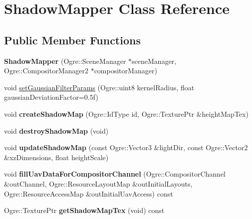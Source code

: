 \hypertarget{class_shadow_mapper}{}\section{Shadow\+Mapper Class Reference}
\label{class_shadow_mapper}
\subsection*{Public Member Functions}
\begin{DoxyCompactItemize}
\item 
\mbox{\label{class_shadow_mapper_a83504b2db6dc914c993011d388d3c139}} 
{\bfseries Shadow\+Mapper} (Ogre\+::\+Scene\+Manager $\ast$scene\+Manager, Ogre\+::\+Compositor\+Manager2 $\ast$compositor\+Manager)
\item 
void \hyperlink{class_shadow_mapper_a5438f906adc558347171a1d4fbbe616d}{set\+Gaussian\+Filter\+Params} (Ogre\+::uint8 kernel\+Radius, float gaussian\+Deviation\+Factor=0.\+5f)
\item 
\mbox{\label{class_shadow_mapper_a05511961c2261cd32eacf534bf0873a8}} 
void {\bfseries create\+Shadow\+Map} (Ogre\+::\+Id\+Type id, Ogre\+::\+Texture\+Ptr \&height\+Map\+Tex)
\item 
\mbox{\label{class_shadow_mapper_aaa7a869e868690bf241b83d9bcb8626d}} 
void {\bfseries destroy\+Shadow\+Map} (void)
\item 
\mbox{\label{class_shadow_mapper_afa29619eed1b51a4088bbfbd64cf1a1a}} 
void {\bfseries update\+Shadow\+Map} (const Ogre\+::\+Vector3 \&light\+Dir, const Ogre\+::\+Vector2 \&xz\+Dimensions, float height\+Scale)
\item 
\mbox{\label{class_shadow_mapper_a993ea2a8424fc5b966bac231b14c5353}} 
void {\bfseries fill\+Uav\+Data\+For\+Compositor\+Channel} (Ogre\+::\+Compositor\+Channel \&out\+Channel, Ogre\+::\+Resource\+Layout\+Map \&out\+Initial\+Layouts, Ogre\+::\+Resource\+Access\+Map \&out\+Initial\+Uav\+Access) const
\item 
\mbox{\label{class_shadow_mapper_a624f59c26a8831b0e3bbabb82ef9a822}} 
Ogre\+::\+Texture\+Ptr {\bfseries get\+Shadow\+Map\+Tex} (void) const
\end{DoxyCompactItemize}


